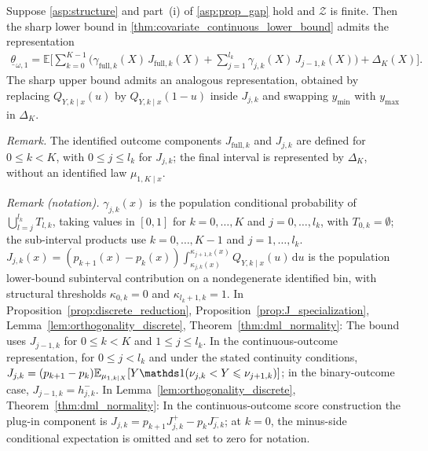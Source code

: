 \begin{proposition}\label{prop:discrete_reduction}
    Suppose \cref{asp:structure} and part~\textup{(i)} of \cref{asp:prop_gap} hold and $\mathcal{Z}$ is finite. Then the sharp lower bound in \cref{thm:covariate_continuous_lower_bound} admits the representation
    \begin{align}\label{eq:target_discrete_iv}
        \underline{\theta}_{\omega,1} = \mathbb{E}\Bigg[\sum_{k=0}^{K-1}\bigg(\gamma_{\text{full},k}(X)\, J_{\text{full},k}(X) + \sum_{j=1}^{l_k} \gamma_{j,k}(X)\, J_{j-1,k}(X)\bigg) + \Delta_K(X) \Bigg].
    \end{align}
    The sharp upper bound admits an analogous representation, obtained by replacing $Q_{Y,k\mid x}(u)$ by $Q_{Y,k\mid x}(1-u)$ inside $J_{j,k}$ and swapping $y_{\min}$ with $y_{\max}$ in $\Delta_K$.
\end{proposition}

\noindent\textit{Remark.} The identified outcome components $J_{\text{full},k}$ and $J_{j,k}$ are defined for $0\leqslant k<K$, with $0\leqslant j\leqslant l_k$ for $J_{j,k}$; the final interval is represented by $\Delta_K$, without an identified law $\mu_{1,K\mid x}$.

\noindent\textit{Remark (notation).} $\gamma_{j,k}(x)$ is the population conditional probability of $\bigcup_{l=j}^{l_k}T_{l,k}$, taking values in $[0,1]$ for $k=0,\ldots,K$ and $j=0,\ldots,l_k$, with $T_{0,k}=\emptyset$; the sub-interval products use $k=0,\ldots,K-1$ and $j=1,\ldots,l_k$. $J_{j,k}(x)=(p_{k+1}(x)-p_k(x))\int_{\kappa_{j,k}(x)}^{\kappa_{j+1,k}(x)}Q_{Y,k\mid x}(u)\,\mathrm du$ is the population lower-bound subinterval contribution on a nondegenerate identified bin, with structural thresholds $\kappa_{0,k}=0$ and $\kappa_{l_k+1,k}=1$. In Proposition~\ref{prop:discrete_reduction}, Proposition~\ref{prop:J_specialization}, Lemma~\ref{lem:orthogonality_discrete}, Theorem~\ref{thm:dml_normality}: The bound uses $J_{j-1,k}$ for $0\leq k<K$ and $1\leq j\leq l_k$. In the continuous-outcome representation, for $0\leq j<l_k$ and under the stated continuity conditions, $J_{j,k}=(p_{k+1}-p_k)\mathbb E_{\mu_{1,k\mid X}}[Y\indicator(\nu_{j,k}<Y\leqslant\nu_{j+1,k})]$; in the binary-outcome case, $J_{j-1,k}=h_{j,k}^{-}$. In Lemma~\ref{lem:orthogonality_discrete}, Theorem~\ref{thm:dml_normality}: In the continuous-outcome score construction the plug-in component is $J_{j,k}=p_{k+1}J_{j,k}^{+}-p_kJ_{j,k}^{-}$; at $k=0$, the minus-side conditional expectation is omitted and set to zero for notation.


